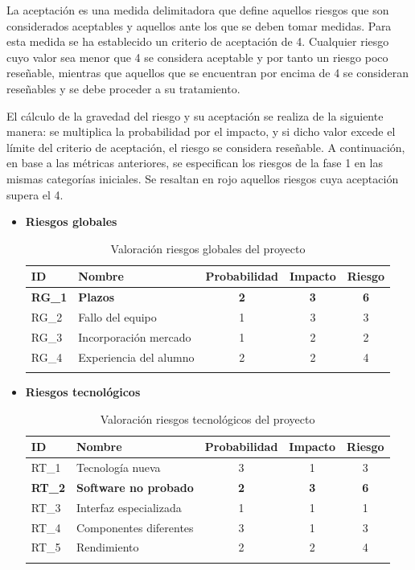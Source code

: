\begin{enumerate}
\begin{itemize}
\endgroup
\end{itemize}
\par La aceptación es una medida delimitadora que define aquellos riesgos que son considerados aceptables y aquellos ante los que se deben tomar medidas. Para esta medida se ha establecido un criterio de aceptación de 4. Cualquier riesgo cuyo valor sea menor que 4 se considera aceptable y por tanto un riesgo poco reseñable, mientras que aquellos que se encuentran por encima de 4 se consideran reseñables y se debe proceder a su tratamiento. 
\par
El cálculo de la gravedad del riesgo y su aceptación se realiza de la siguiente manera: se multiplica la probabilidad por el impacto, y si dicho valor excede el límite del criterio de aceptación, el riesgo se considera reseñable. 
A continuación, en base a las métricas anteriores, se especifican los riesgos de la fase 1 en las mismas categorías iniciales. Se resaltan en rojo aquellos riesgos cuya aceptación supera el 4.

\begin{itemize}

\item \textbf{Riesgos globales}
\begingroup
\renewcommand\arraystretch{1.3}

\begin{longtable}{l p{5cm} ccc}
\hline
\textbf{ID} & \textbf{Nombre} & \textbf{Probabilidad} & \textbf{Impacto} & \textbf{Riesgo} \\
\hline
\endhead
\endfoot
\textbf{RG\_1} & 
\textbf{Plazos} &
\textbf{2} &
\textbf{3} &
\textbf{6} 
 \\
RG\_2 & 
Fallo del equipo &
1 &
3 &
3 
 \\
RG\_3 & 
Incorporación mercado &
1 &
2 &
2 
 \\
RG\_4 & 
Experiencia del alumno &
2 &
2 &
4 
 \\
\hline
\caption{Valoración riesgos globales del proyecto}\label{ries_glob_valoracion}\\
\end{longtable}

\item \textbf{Riesgos tecnológicos}
\begin{longtable}{l p{5cm} ccc}
\hline
\textbf{ID} & \textbf{Nombre} & \textbf{Probabilidad} & \textbf{Impacto} & \textbf{Riesgo} \\
\hline
\endhead
\endfoot
RT\_1 & 
Tecnología nueva &
3 &
1 &
3 
 \\
\textbf{RT\_2} & 
\textbf{Software no probado} &
\textbf{2} &
\textbf{3} &
\textbf{6} 
 \\
RT\_3 & 
Interfaz especializada &
1 &
1 &
1 
 \\
RT\_4 & 
Componentes diferentes &
3 &
1 &
3 
 \\
RT\_5 & 
Rendimiento &
2 &
2 &
4 
 \\
\hline
\caption{Valoración riesgos tecnológicos del proyecto}\label{ries_tecno_valoracion}\\
\end{longtable}


\end{itemize}
\end{enumerate}
